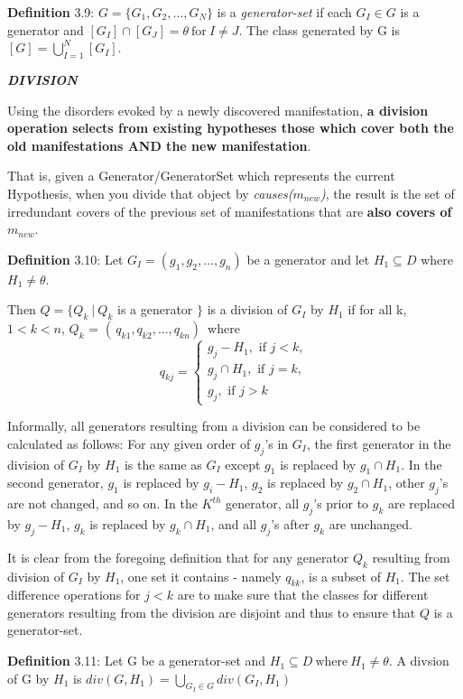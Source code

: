 \documentclass{article}
\begin{document}
\par 
\textbf{Definition} 3.9: $G = \{G_1, G_2, \ldots, G_N\}$ is a
\textit{generator-set} if each $G_I \in G$ is a generator and $[G_I] \cap
[G_J] = \theta\ \text{for}\ I \neq J$. 
The class generated by G is $[G] = \bigcup\limits_{I=1}^{N}[G_I]$.
\newline
\newline
\par
\textit{\textbf{DIVISION}}
\newline
\par
Using the disorders evoked by a newly discovered manifestation, \textbf{a
division operation selects from existing hypotheses those which cover both the old
manifestations AND the new manifestation}.
\newline
\par
That is, given a Generator/GeneratorSet which represents the current Hypothesis,
when you divide that object by \textit{causes($m_{new}$)}, the result is the set
of irredundant covers of the previous set of manifestations that are
\textbf{also covers of $m_{new}$}.
\newline
\par
\textbf{Definition} 3.10: Let $G_I = (g_1, g_2, \ldots, g_n)$ be a generator 
and let $H_1 \subseteq D$ where $H_1 \neq \theta$. 

Then $Q = \{ Q_k \:|\:Q_k$ is a generator $\}$ is a division of $G_I$ by $H_1$
if for all k, $1 < k < n$, $Q_k$ = $( \, q_{k1}, q_{k2}, \ldots, q_{kn} ) \,$ where
\[
  q_{kj} =
	\begin{cases}
		g_j - H_1, \text{ if } j < k,\\
		g_j \cap H_1, \text{ if } j = k,\\
		g_j, \text{ if } j > k
	\end{cases}
\]
\par
Informally, all generators resulting from a division can be considered to be
calculated as follows: \newline
For any given order of $g_j$'s in $G_I$, the first generator in the division of
$G_I$ by $H_1$ is the same as $G_I$ except $g_1$ is replaced by $g_1 \cap H_1$.
In the second generator, $g_1$ is replaced by $g_i - H_1$, $g_2$ is replaced by
$g_2 \cap H_1$, other $g_j$'s are not changed, and so on. In the $K^{th}$
generator, all $g_j$'s prior to $g_k$ are replaced by $g_j - H_1$, $g_k$ is
replaced by $g_k \cap H_1$, and all $g_j$'s after $g_k$ are unchanged. 
\par
It is clear from the foregoing definition that for any generator $Q_k$ resulting
from division of $G_I$ by $H_1$, one set it contains - namely $q_{kk}$, is a
subset of $H_1$. The set difference operations for $j < k$ are to make sure that
the classes for different generators resulting from the division are disjoint
and thus to ensure that $Q$ is a generator-set. 
\newline
\par 
\textbf{Definition} 3.11: Let G be a generator-set and $H_1 \subseteq D\
\text{where}\ H_1 \neq \theta$. A divsion of G by $H_1$ is $div(G, H_1) =
\bigcup\limits_{G_I \in G} div(G_I, H_1)$
\newline
\end{document}
